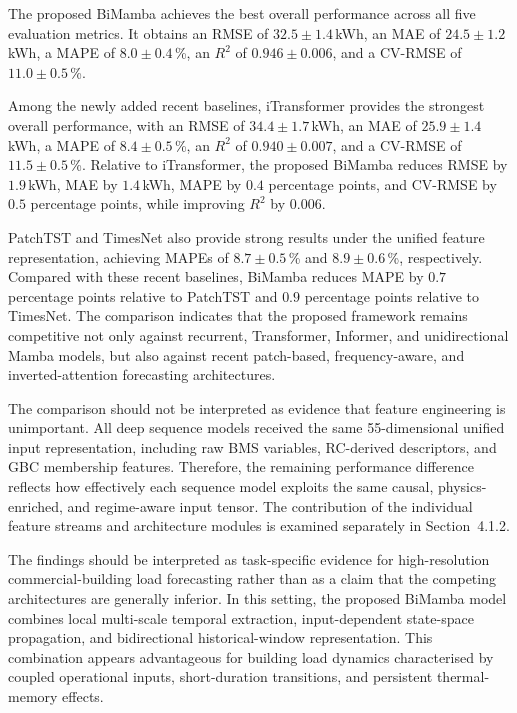\documentclass[11pt]{article}
\begin{document}
The proposed BiMamba achieves the best overall performance across all five evaluation metrics. It obtains an RMSE of $32.5\pm1.4$\,kWh, an MAE of $24.5\pm1.2$\,kWh, a MAPE of $8.0\pm0.4$\,\%, an $R^2$ of $0.946\pm0.006$, and a CV-RMSE of $11.0\pm0.5$\,\%.

Among the newly added recent baselines, iTransformer provides the strongest overall performance, with an RMSE of $34.4\pm1.7$\,kWh, an MAE of $25.9\pm1.4$\,kWh, a MAPE of $8.4\pm0.5$\,\%, an $R^2$ of $0.940\pm0.007$, and a CV-RMSE of $11.5\pm0.5$\,\%. Relative to iTransformer, the proposed BiMamba reduces RMSE by $1.9$\,kWh, MAE by $1.4$\,kWh, MAPE by $0.4$ percentage points, and CV-RMSE by $0.5$ percentage points, while improving $R^2$ by $0.006$.

PatchTST and TimesNet also provide strong results under the unified feature representation, achieving MAPEs of $8.7\pm0.5$\,\% and $8.9\pm0.6$\,\%, respectively. Compared with these recent baselines, BiMamba reduces MAPE by $0.7$ percentage points relative to PatchTST and $0.9$ percentage points relative to TimesNet. The comparison indicates that the proposed framework remains competitive not only against recurrent, Transformer, Informer, and unidirectional Mamba models, but also against recent patch-based, frequency-aware, and inverted-attention forecasting architectures.

The comparison should not be interpreted as evidence that feature engineering is unimportant. All deep sequence models received the same 55-dimensional unified input representation, including raw BMS variables, RC-derived descriptors, and GBC membership features. Therefore, the remaining performance difference reflects how effectively each sequence model exploits the same causal, physics-enriched, and regime-aware input tensor. The contribution of the individual feature streams and architecture modules is examined separately in Section~4.1.2.

The findings should be interpreted as task-specific evidence for high-resolution commercial-building load forecasting rather than as a claim that the competing architectures are generally inferior. In this setting, the proposed BiMamba model combines local multi-scale temporal extraction, input-dependent state-space propagation, and bidirectional historical-window representation. This combination appears advantageous for building load dynamics characterised by coupled operational inputs, short-duration transitions, and persistent thermal-memory effects.
\end{document}
